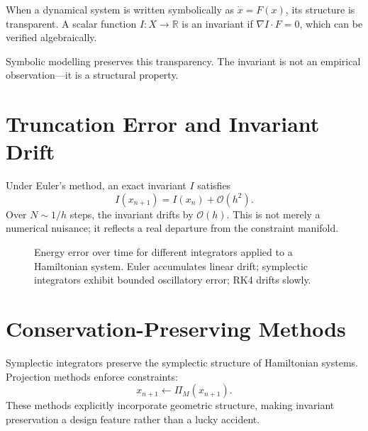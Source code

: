 \documentclass[12pt,openany]{book}
\newcommand{\R}{\mathbb{R}}
\begin{document}
When a dynamical system is written symbolically as $\dot x = F(x)$, its
structure is transparent. A scalar function $I:X\to\R$ is an invariant if
$\nabla I\cdot F=0$, which can be verified algebraically.

Symbolic modelling preserves this transparency. The invariant is not an
empirical observation—it is a structural property.

\section{Truncation Error and Invariant Drift}

Under Euler's method, an exact invariant $I$ satisfies
\[
  I(x_{n+1}) = I(x_n) + \mathcal{O}(h^2).
\]
Over $N\sim 1/h$ steps, the invariant drifts by $\mathcal{O}(h)$. This is
not merely a numerical nuisance; it reflects a real departure from the
constraint manifold.

\begin{figure}[H]
\centering
{}
\caption{Energy error over time for different integrators applied to a
Hamiltonian system. Euler accumulates linear drift; symplectic integrators
exhibit bounded oscillatory error; RK4 drifts slowly.}
\label{fig:energy-drift}
\end{figure}

\section{Conservation-Preserving Methods}

Symplectic integrators preserve the symplectic structure of Hamiltonian
systems. Projection methods enforce constraints:
\[
  x_{n+1} \leftarrow \Pi_M(x_{n+1}).
\]
These methods explicitly incorporate geometric structure, making invariant
preservation a design feature rather than a lucky accident.
\end{document}
